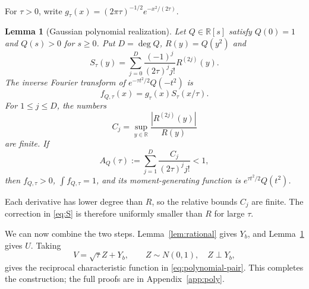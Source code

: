 \documentclass[11pt,twoside]{article}
\theoremstyle{journalplain}
\numberwithin{equation}{section}
\newtheorem{lemma}[theorem]{Lemma}
\theoremstyle{journaldefinition}
\newcommand{\R}{\mathbb R}
\begin{document}
For $\tau>0$, write $g_\tau(x)=(2\pi\tau)^{-1/2}e^{-x^2/(2\tau)}$.
\begin{lemma}[Gaussian polynomial realization]\label{lem:gaussian}
Let $Q\in\R[s]$ satisfy $Q(0)=1$ and $Q(s)>0$ for $s\ge0$. Put $D=\deg Q$, $R(y)=Q(y^2)$ and
\begin{equation}\label{eq:S}
 S_\tau(y)=\sum_{j=0}^D\frac{(-1)^j}{(2\tau)^j j!}R^{(2j)}(y).
\end{equation}
The inverse Fourier transform of $e^{-\tau t^2/2}Q(-t^2)$ is
\begin{equation}\label{eq:U-density}
 f_{Q,\tau}(x)=g_\tau(x)S_\tau(x/\tau).
\end{equation}
For $1\le j\le D$, the numbers
\[
 C_j=\sup_{y\in\R}\frac{|R^{(2j)}(y)|}{R(y)}
\]
are finite. If
\begin{equation}\label{eq:tau-certificate}
 A_Q(\tau):=\sum_{j=1}^D\frac{C_j}{(2\tau)^j j!}<1,
\end{equation}
then $f_{Q,\tau}>0$, $\int f_{Q,\tau}=1$, and its moment-generating function is $e^{\tau t^2/2}Q(t^2)$.
\end{lemma}
Each derivative has lower degree than $R$, so the relative bounds $C_j$ are finite. The correction in \eqref{eq:S} is therefore uniformly smaller than $R$ for large $\tau$.

We can now combine the two steps. Lemma~\ref{lem:rational} gives $Y_b$, and Lemma~\ref{lem:gaussian} gives $U$. Taking
\begin{equation}\label{eq:V-construction}
 V=\sqrt\tau Z+Y_b,\qquad Z\sim N(0,1),\quad Z\perp Y_b,
\end{equation}
gives the reciprocal characteristic function in \eqref{eq:polynomial-pair}. This completes the construction; the full proofs are in Appendix~\ref{app:poly}.
\end{document}
